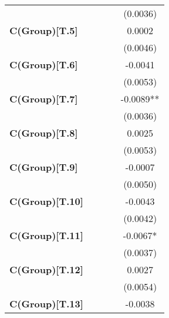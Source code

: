 \begin{center}
\begin{tabular}{lcccc}
\textbf{ }                     &                  &                  &                  &     (0.0036)      \\
\textbf{C(Group)[T.5]}         &                  &                  &                  &      0.0002       \\
\textbf{ }                     &                  &                  &                  &     (0.0046)      \\
\textbf{C(Group)[T.6]}         &                  &                  &                  &     -0.0041       \\
\textbf{ }                     &                  &                  &                  &     (0.0053)      \\
\textbf{C(Group)[T.7]}         &                  &                  &                  &    -0.0089**      \\
\textbf{ }                     &                  &                  &                  &     (0.0036)      \\
\textbf{C(Group)[T.8]}         &                  &                  &                  &      0.0025       \\
\textbf{ }                     &                  &                  &                  &     (0.0053)      \\
\textbf{C(Group)[T.9]}         &                  &                  &                  &     -0.0007       \\
\textbf{ }                     &                  &                  &                  &     (0.0050)      \\
\textbf{C(Group)[T.10]}        &                  &                  &                  &     -0.0043       \\
\textbf{ }                     &                  &                  &                  &     (0.0042)      \\
\textbf{C(Group)[T.11]}        &                  &                  &                  &     -0.0067*      \\
\textbf{ }                     &                  &                  &                  &     (0.0037)      \\
\textbf{C(Group)[T.12]}        &                  &                  &                  &      0.0027       \\
\textbf{ }                     &                  &                  &                  &     (0.0054)      \\
\textbf{C(Group)[T.13]}        &                  &                  &                  &     -0.0038       \\

\end{tabular}
\end{center}
